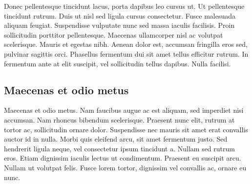 Donec pellentesque tincidunt lacus, porta dapibus leo cursus ut. Ut pellentesque tincidunt rutrum. 
Duis ut nisl sed ligula cursus consectetur. Fusce malesuada aliquam feugiat. 
Suspendisse vulputate nunc sed massa iaculis facilisis. Proin sollicitudin porttitor pellentesque. 
Maecenas ullamcorper nisl ac volutpat scelerisque. Mauris et egestas nibh. 
Aenean dolor est, accumsan fringilla eros sed, pulvinar sagittis orci. 
Phasellus fermentum dui sit amet tellus efficitur rutrum. In fermentum ante at elit suscipit, 
vel sollicitudin tellus dapibus. Nulla facilisi.

\subsection{Maecenas et odio metus}
Maecenas et odio metus. Nam faucibus augue ac est aliquam, sed imperdiet nisi accumsan. 
Nam rhoncus bibendum scelerisque. Praesent nunc elit, rutrum at tortor ac, sollicitudin ornare dolor. 
Suspendisse nec mauris sit amet erat convallis auctor id in nulla. 
Morbi quis eleifend arcu, sit amet fermentum justo. Sed hendrerit ligula neque, vel consectetur 
ipsum tincidunt a. Nullam sed rutrum eros. Etiam dignissim iaculis lectus ut condimentum. 
Praesent eu suscipit arcu. Nullam ut volutpat felis. Fusce lorem tortor, dignissim vel convallis ac, 
ornare eu nunc.\cite{sommerville2019architecture}